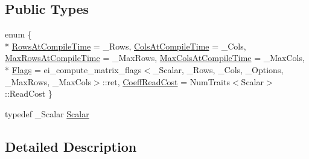 \subsection*{Public Types}
\begin{DoxyCompactItemize}
\item 
enum \{ \\*
\hyperlink{structei__traits_3_01_matrix_3_01___scalar_00_01___rows_00_01___cols_00_01___options_00_01___max42eca4acfde64c6129563dd143e7773e_abd2f016cad615ecfde4130fcf6345cf8ad31a41ae96165138e21706b6b6e2ba3f}{Rows\-At\-Compile\-Time} = \-\_\-\-Rows, 
\hyperlink{structei__traits_3_01_matrix_3_01___scalar_00_01___rows_00_01___cols_00_01___options_00_01___max42eca4acfde64c6129563dd143e7773e_abd2f016cad615ecfde4130fcf6345cf8aaba324382718903927fd3dd81d7d4a68}{Cols\-At\-Compile\-Time} = \-\_\-\-Cols, 
\hyperlink{structei__traits_3_01_matrix_3_01___scalar_00_01___rows_00_01___cols_00_01___options_00_01___max42eca4acfde64c6129563dd143e7773e_abd2f016cad615ecfde4130fcf6345cf8a682cf22ef57a8e547789588bb891647b}{Max\-Rows\-At\-Compile\-Time} = \-\_\-\-Max\-Rows, 
\hyperlink{structei__traits_3_01_matrix_3_01___scalar_00_01___rows_00_01___cols_00_01___options_00_01___max42eca4acfde64c6129563dd143e7773e_abd2f016cad615ecfde4130fcf6345cf8a47973b44edfcb2b2f738e8c8264972df}{Max\-Cols\-At\-Compile\-Time} = \-\_\-\-Max\-Cols, 
\\*
\hyperlink{structei__traits_3_01_matrix_3_01___scalar_00_01___rows_00_01___cols_00_01___options_00_01___max42eca4acfde64c6129563dd143e7773e_abd2f016cad615ecfde4130fcf6345cf8a4bd28ef0be33d901be6022a5cd8e2200}{Flags} = ei\-\_\-compute\-\_\-matrix\-\_\-flags$<$\-\_\-\-Scalar, \-\_\-\-Rows, \-\_\-\-Cols, \-\_\-\-Options, \-\_\-\-Max\-Rows, \-\_\-\-Max\-Cols$>$\-:\-:ret, 
\hyperlink{structei__traits_3_01_matrix_3_01___scalar_00_01___rows_00_01___cols_00_01___options_00_01___max42eca4acfde64c6129563dd143e7773e_abd2f016cad615ecfde4130fcf6345cf8aa031e50f4d6844151cfa2cf1f7daedc2}{Coeff\-Read\-Cost} = Num\-Traits$<$Scalar$>$\-:\-:Read\-Cost
 \}
\item 
typedef \-\_\-\-Scalar \hyperlink{structei__traits_3_01_matrix_3_01___scalar_00_01___rows_00_01___cols_00_01___options_00_01___max42eca4acfde64c6129563dd143e7773e_a317465bc5205a1c9306b6c44b4b39649}{Scalar}
\end{DoxyCompactItemize}


\subsection{Detailed Description}
